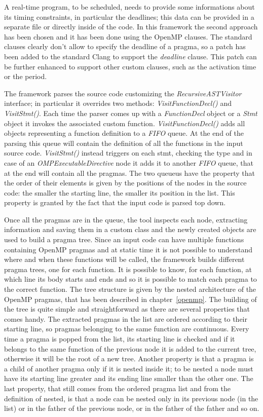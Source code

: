 \documentclass[a4paper,12pt,oneside]{book}
\begin{document}
A real-time program, to be scheduled, needs to provide some informations about its timing constraints, in particular the deadlines; this data can be provided in a separate file or directly inside of the code. In this framework the second approach has been chosen and it has been done using the OpenMP clauses. The standard clauses clearly don’t allow to specify the deadline of a pragma, so a patch has been added to the standard Clang to support the \emph{deadline} clause. This patch can be further enhanced to support other custom clauses, such as the activation time or the period.

The framework parses the source code customizing the \emph{RecursiveASTVisitor} interface; in particular it overrides two methods: \emph{VisitFunctionDecl()} and \emph{VisitStmt()}. Each time the parser comes up with a \emph{FunctionDecl} object or a \emph{Stmt} object it invokes the associated custom function. \emph{VisitFunctionDecl()} adds all objects representing a function definition to a \emph{FIFO} queue.  At the end of the parsing this queue will contain the definition of all the functions in the input source code. \emph{VisitStmt()} instead triggers on each stmt, checking the type and in case of an \emph{OMPExecutableDirective} node it adds it to another \emph{FIFO} queue, that at the end will contain all the pragmas. The two queueus have the property that the order of their elements is given by the positions of the nodes in the source code: the smaller the starting line, the smaller its position in the list. This property is granted by the fact that the input code is parsed top down.

Once all the pragmas are in the queue, the tool inspects each node, extracting information and saving them in a custom class and the newly created objects are used to build a pragma tree. Since an input code can have multiple functions containing OpenMP pragmas and at static time it is not possible to understand where and when these functions will be called, the framework builds different pragma trees, one for each function. It is possible to know, for each function, at which line its body starts and ends and so it is possible to match each pragma to the correct function. The tree structure is given by the nested architecture of the OpenMP pragmas, that has been described in chapter~\ref{openmp}. The building of the tree is quite simple and straightforward as there are several properties that comes handy. The extracted pragmas in the list are ordered according to their starting line, so pragmas belonging to the same function are continuous. Every time a pragma is popped from the list, its starting line is checked and if it belongs to the same function of the previous node it is added to the current tree, otherwise it will be the root of a new tree. Another property is that a pragma is a child of another pragma only if it is nested inside it; to be nested a node must have its starting line greater and its ending line smaller than the other one.  The last property, that still comes from the ordered pragma list and from the definition of nested, is that a node can be nested only in its previous node (in the list) or in the father of the previous node, or in the father of the father and so on.
\end{document}
